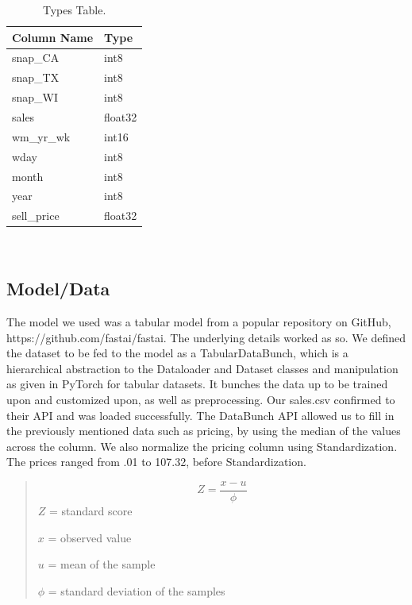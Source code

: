 \documentclass[10pt,twocolumn,letterpaper]{article}
\begin{document}
\begin{table}[]
  \begin{center}
    \begin{tabular}{|l|l|}
      \hline
            Column Name & Type \\
      \hline\hline
      snap\_CA & int8 \\
      snap\_TX & int8 \\
      snap\_WI & int8 \\
      sales & float32 \\
      wm\_yr\_wk & int16 \\
      wday & int8 \\
      month & int8 \\
      year & int8 \\
      sell\_price & float32 \\
      \hline
    \end{tabular}
  \end{center}
  \label{typesTable}\
  \caption{Types Table.}
\end{table}


\subsection{Model/Data}
The model we used was a tabular model from a popular repository on GitHub,
https://github.com/fastai/fastai. The underlying details worked as so. We
defined the dataset to be fed to the model as a TabularDataBunch, which is a
hierarchical abstraction to the Dataloader and Dataset classes and manipulation
as given in PyTorch for tabular datasets. It bunches the data up to be trained
upon and customized upon, as well as preprocessing. Our sales.csv confirmed to
their API and was loaded successfully. The DataBunch API allowed us to fill in
the previously mentioned data such as pricing, by using the median of the values
across the column. We also normalize the pricing column using Standardization.
The prices ranged from .01 to 107.32, before Standardization.

\begin{quote}
  \begin{equation}
    Z=\frac{x-u}{\phi}
    \label{newEquatation}
  \end{equation}
  $Z$ = standard score

  $x$ = observed value

  $u$ = mean of the sample

  $\phi$ = standard deviation of the samples
\end{quote}
\end{document}
